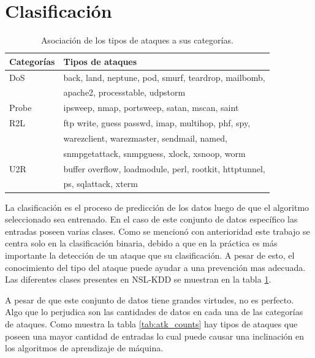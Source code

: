 \section{Clasificación}
\begin{table}[b]
    \begin{center}
        \label{tab:class}
        \begin{tabular}{l|l} %
        \textbf{Categorías} & \textbf{Tipos de ataques}\\
        \hline
        DoS & back, land, neptune, pod, smurf, teardrop, mailbomb,\\ 
        & apache2, processtable, udpstorm\\
        Probe & ipsweep, nmap, portsweep, satan, mscan, saint\\
        R2L & ftp write, guess passwd, imap, multihop, phf, spy,\\
        & warezclient, warezmaster, sendmail, named,\\
        & snmpgetattack, snmpguess, xlock, xsnoop, worm\\
        U2R & buffer overflow, loadmodule, perl, rootkit, httptunnel,\\
        & ps, sqlattack, xterm\\
        \end{tabular}

        \caption{Asociación de los tipos de ataques a sus categorías.}
    \end{center}
\end{table}

La clasificación es el proceso de predicción de los datos luego de que el algoritmo seleccionado sea entrenado. En el caso de este conjunto de datos específico las entradas poseen varias clases. Como se mencionó con anterioridad este trabajo se centra solo en la clasificación binaria, debido a que en la práctica es más importante la detección de un ataque que su clasificación. A pesar de esto, el conocimiento del tipo del ataque puede ayudar a una prevención mas adecuada. Las diferentes clases presentes en NSL-KDD se muestran en la tabla \ref{tab:class}.

A pesar de que este conjunto de datos tiene grandes virtudes, no es perfecto. Algo que lo perjudica son las cantidades de datos en cada una de las categorías de ataques. Como muestra la tabla \ref{tab:atk_counts} hay tipos de ataques que poseen una mayor cantidad de entradas lo cual puede causar una inclinación en los algoritmos de aprendizaje de máquina.


